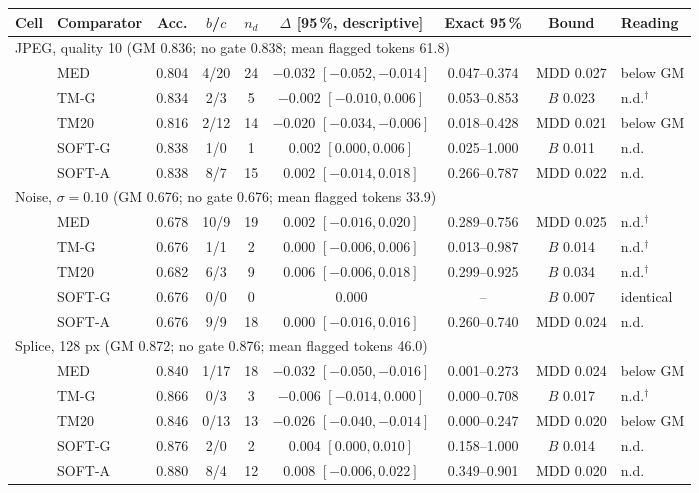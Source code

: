 \begin{table}[!tbp]
\begin{adjustbox}{max width=\textwidth}
\begin{tabular}{llccccccl}
\toprule
Cell & Comparator & Acc. & $b$/$c$ & $n_d$ & $\Delta$ [95\,\%, descriptive] & Exact 95\,\% & Bound & Reading \\
\midrule
\multicolumn{9}{l}{JPEG, quality 10 \quad (GM 0.836; no gate 0.838; mean flagged tokens 61.8)} \\
& MED & 0.804 & 4/20 & 24 & $\mathbf{-0.032}$ $[-0.052,-0.014]$ & 0.047--0.374 & MDD 0.027 & below GM \\
& TM-G & 0.834 & 2/3 & 5 & $-0.002$ $[-0.010,0.006]$ & 0.053--0.853 & $B$ 0.023 & n.d.$^{\dagger}$ \\
& TM20 & 0.816 & 2/12 & 14 & $\mathbf{-0.020}$ $[-0.034,-0.006]$ & 0.018--0.428 & MDD 0.021 & below GM \\
& SOFT-G & 0.838 & 1/0 & 1 & $0.002$ $[0.000,0.006]$ & 0.025--1.000 & $B$ 0.011 & n.d. \\
& SOFT-A & 0.838 & 8/7 & 15 & $0.002$ $[-0.014,0.018]$ & 0.266--0.787 & MDD 0.022 & n.d. \\
\midrule
\multicolumn{9}{l}{Noise, $\sigma=0.10$ \quad (GM 0.676; no gate 0.676; mean flagged tokens 33.9)} \\
& MED & 0.678 & 10/9 & 19 & $0.002$ $[-0.016,0.020]$ & 0.289--0.756 & MDD 0.025 & n.d.$^{\dagger}$ \\
& TM-G & 0.676 & 1/1 & 2 & $0.000$ $[-0.006,0.006]$ & 0.013--0.987 & $B$ 0.014 & n.d.$^{\dagger}$ \\
& TM20 & 0.682 & 6/3 & 9 & $0.006$ $[-0.006,0.018]$ & 0.299--0.925 & $B$ 0.034 & n.d.$^{\dagger}$ \\
& SOFT-G & 0.676 & 0/0 & 0 & $0.000$ & -- & $B$ 0.007 & identical \\
& SOFT-A & 0.676 & 9/9 & 18 & $0.000$ $[-0.016,0.016]$ & 0.260--0.740 & MDD 0.024 & n.d. \\
\midrule
\multicolumn{9}{l}{Splice, 128 px \quad (GM 0.872; no gate 0.876; mean flagged tokens 46.0)} \\
& MED & 0.840 & 1/17 & 18 & $\mathbf{-0.032}$ $[-0.050,-0.016]$ & 0.001--0.273 & MDD 0.024 & below GM \\
& TM-G & 0.866 & 0/3 & 3 & $-0.006$ $[-0.014,0.000]$ & 0.000--0.708 & $B$ 0.017 & n.d.$^{\dagger}$ \\
& TM20 & 0.846 & 0/13 & 13 & $\mathbf{-0.026}$ $[-0.040,-0.014]$ & 0.000--0.247 & MDD 0.020 & below GM \\
& SOFT-G & 0.876 & 2/0 & 2 & $0.004$ $[0.000,0.010]$ & 0.158--1.000 & $B$ 0.014 & n.d. \\
& SOFT-A & 0.880 & 8/4 & 12 & $0.008$ $[-0.006,0.022]$ & 0.349--0.901 & MDD 0.020 & n.d. \\

\end{tabular}
\end{adjustbox}
\end{table}

